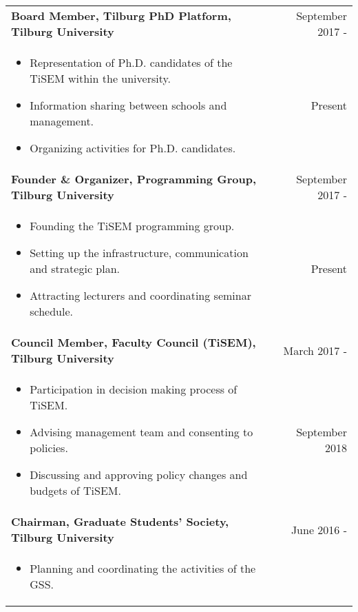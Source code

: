 \documentclass[a4paper,8pt]{article}
\begin{document}
\begin{tabular}{p{15cm}r}
\textbf{Board Member, Tilburg PhD Platform, Tilburg University}  &September 2017 -\\ \vspace{-0.5em}
	\begin{itemize}
		\item Representation of Ph.D. candidates of the TiSEM within the university.
		\item Information sharing between schools and management.
		\item Organizing activities for Ph.D. candidates.
	\end{itemize} & Present\phantom{ -}\vspace{-1.0em}\\ 
\textbf{Founder \& Organizer, Programming Group, Tilburg University}  &September 2017 -\\ \vspace{-0.5em}
	\begin{itemize}[noitemsep]
		\item Founding the TiSEM programming group.
		\item Setting up the infrastructure, communication and strategic plan.
		\item Attracting lecturers and coordinating seminar schedule.
	\end{itemize} & Present\phantom{ -}\vspace{-1.0em} \\ 
\textbf{Council Member, Faculty Council (TiSEM), Tilburg University}  &March 2017 -\\ \vspace{-0.5em}
	\begin{itemize}[noitemsep]
		\item Participation in decision making process of TiSEM.
		\item Advising management team and consenting to policies.
		\item Discussing and approving policy changes and budgets of TiSEM.
	\end{itemize} & September 2018\phantom{ -}\vspace{-1.0em} \\
\textbf{Chairman, Graduate Students' Society, Tilburg University}  &June 2016 -\\ \vspace{-0.5em}
	\begin{itemize}[noitemsep]
		\item Planning and coordinating the activities of the GSS.

\end{itemize}
\end{tabular}
\end{document}
